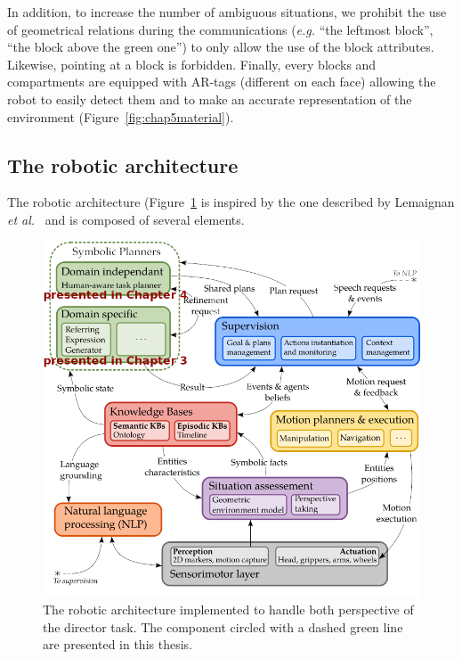 \documentclass[a4paper,11pt,twoside]{StyleThese}
\begin{document}
In addition, to increase the number of ambiguous situations, we prohibit the use of geometrical relations during the communications (\textit{e.g.} ``the leftmost block'', ``the block above the green one'') to only allow the use of the block attributes. Likewise, pointing at a block is forbidden.
Finally, every blocks and compartments are equipped with AR-tags (different on each face) allowing the robot to easily detect them and to make an accurate representation of the environment (Figure~\ref{fig:chap5material}).

\subsection{The robotic architecture}
The robotic architecture (Figure~\ref{fig:chap5dtarchi} is inspired by the one described by Lemaignan \textit{et al.}~\cite{lemaignan2017artificial} and is composed of several elements.

\begin{figure}[hbtp]
\centering
\includegraphics[width=\textwidth]{figures/chapter5/architecture.png}
\caption{The robotic architecture implemented to handle both perspective of the director task. The component circled with a dashed green line are presented in this thesis.}
\label{fig:chap5dtarchi}
\end{figure}
\end{document}
